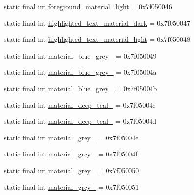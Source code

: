 \begin{DoxyCompactItemize}
\item 
static final int \mbox{\hyperlink{classandroid_1_1support_1_1design_1_1_r_1_1color_a63848c6f48c8f9f3196a62ebdd80a4ec}{foreground\+\_\+material\+\_\+light}} = 0x7f050046
\item 
static final int \mbox{\hyperlink{classandroid_1_1support_1_1design_1_1_r_1_1color_a6ab9e4175ec63197d0900ba09a0f97ea}{highlighted\+\_\+text\+\_\+material\+\_\+dark}} = 0x7f050047
\item 
static final int \mbox{\hyperlink{classandroid_1_1support_1_1design_1_1_r_1_1color_ac907c1357540e315526c5cbcf77e1c8b}{highlighted\+\_\+text\+\_\+material\+\_\+light}} = 0x7f050048
\item 
static final int \mbox{\hyperlink{classandroid_1_1support_1_1design_1_1_r_1_1color_a94ad9c11ec4c2f4f4363086c0912cc02}{material\+\_\+blue\+\_\+grey\+\_}} = 0x7f050049
\item 
static final int \mbox{\hyperlink{classandroid_1_1support_1_1design_1_1_r_1_1color_a46a38525b5abce02d2af2b0952a03acb}{material\+\_\+blue\+\_\+grey\+\_}} = 0x7f05004a
\item 
static final int \mbox{\hyperlink{classandroid_1_1support_1_1design_1_1_r_1_1color_a4ffe46d495ab57f7786eb9a71332a046}{material\+\_\+blue\+\_\+grey\+\_}} = 0x7f05004b
\item 
static final int \mbox{\hyperlink{classandroid_1_1support_1_1design_1_1_r_1_1color_a2327adad97cad903af16d58929baff0a}{material\+\_\+deep\+\_\+teal\+\_}} = 0x7f05004c
\item 
static final int \mbox{\hyperlink{classandroid_1_1support_1_1design_1_1_r_1_1color_aa324b4dbc847bbffae73fe41c72d6196}{material\+\_\+deep\+\_\+teal\+\_}} = 0x7f05004d
\item 
static final int \mbox{\hyperlink{classandroid_1_1support_1_1design_1_1_r_1_1color_a2a0f568154bdaa62d15bf34a00c304ad}{material\+\_\+grey\+\_}} = 0x7f05004e
\item 
static final int \mbox{\hyperlink{classandroid_1_1support_1_1design_1_1_r_1_1color_a1705b753106c00c13828ca1244c48efc}{material\+\_\+grey\+\_}} = 0x7f05004f
\item 
static final int \mbox{\hyperlink{classandroid_1_1support_1_1design_1_1_r_1_1color_a14fe6537794cbcbbc8d4a37c47aee322}{material\+\_\+grey\+\_}} = 0x7f050050
\item 
static final int \mbox{\hyperlink{classandroid_1_1support_1_1design_1_1_r_1_1color_a57555e23bbe3cc7c4f9c5f77592cfbf1}{material\+\_\+grey\+\_}} = 0x7f050051
\item 

\end{DoxyCompactItemize}
